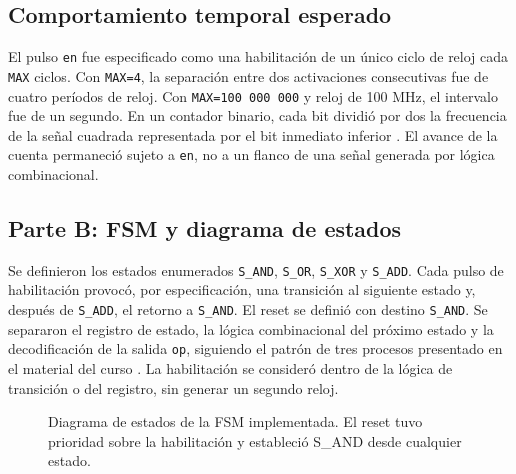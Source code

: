 \subsection{Comportamiento temporal esperado}
El pulso \texttt{en} fue especificado como una habilitación de un único ciclo de reloj cada \texttt{MAX} ciclos. Con \texttt{MAX=4}, la separación entre dos activaciones consecutivas fue de cuatro períodos de reloj. Con \texttt{MAX=100\,000\,000} y reloj de 100 MHz, el intervalo fue de un segundo. En un contador binario, cada bit dividió por dos la frecuencia de la señal cuadrada representada por el bit inmediato inferior \cite{cursodiv}. El avance de la cuenta permaneció sujeto a \texttt{en}, no a un flanco de una señal generada por lógica combinacional.

\subsection{Parte B: FSM y diagrama de estados}
Se definieron los estados enumerados \texttt{S\_AND}, \texttt{S\_OR}, \texttt{S\_XOR} y \texttt{S\_ADD}. Cada pulso de habilitación provocó, por especificación, una transición al siguiente estado y, después de \texttt{S\_ADD}, el retorno a \texttt{S\_AND}. El reset se definió con destino \texttt{S\_AND}. Se separaron el registro de estado, la lógica combinacional del próximo estado y la decodificación de la salida \texttt{op}, siguiendo el patrón de tres procesos presentado en el material del curso \cite{cursofsm}. La habilitación se consideró dentro de la lógica de transición o del registro, sin generar un segundo reloj.

\begin{figure}[!t]
\centering
{}
\caption{Diagrama de estados de la FSM implementada. El reset tuvo prioridad sobre la habilitación y estableció S\_AND desde cualquier estado.}\label{fig:fsm}
\end{figure}

